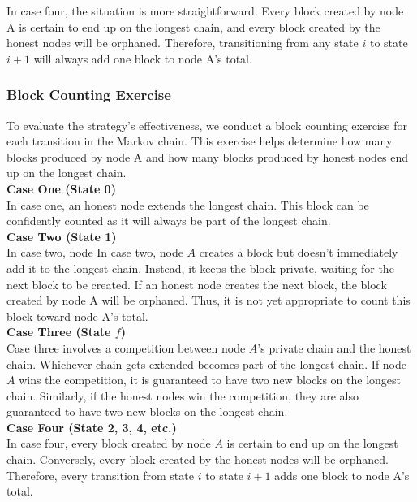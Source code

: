 In case four, the situation is more straightforward. Every block created by node A is certain to end up on the longest chain, and every block created by the honest nodes will be orphaned. Therefore, transitioning from any state $i$ to state $i+1$ will always add one block to node A's total.

\subsubsection{Block Counting Exercise}
To evaluate the strategy's effectiveness, we conduct a block counting exercise for each transition in the Markov chain. This exercise helps determine how many blocks produced by node A and how many blocks produced by honest nodes end up on the longest chain.\\

\noindent
\textbf{Case One (State 0)}\\
In case one, an honest node extends the longest chain. This block can be confidently counted as it will always be part of the longest chain.\\

\noindent
\textbf{Case Two (State 1)}\\
In case two, node In case two, node $A$ creates a block but doesn't immediately add it to the longest chain. Instead, it keeps the block private, waiting for the next block to be created. If an honest node creates the next block, the block created by node A will be orphaned. Thus, it is not yet appropriate to count this block toward node A's total.\\

\noindent
\textbf{Case Three (State $f$)}\\
Case three involves a competition between node $A$'s private chain and the honest chain. Whichever chain gets extended becomes part of the longest chain. If node $A$ wins the competition, it is guaranteed to have two new blocks on the longest chain. Similarly, if the honest nodes win the competition, they are also guaranteed to have two new blocks on the longest chain.\\

\noindent
\textbf{Case Four (State 2, 3, 4, etc.)}\\
In case four, every block created by node $A$ is certain to end up on the longest chain. Conversely, every block created by the honest nodes will be orphaned. Therefore, every transition from state $i$ to state $i+1$ adds one block to node A's total.\\

